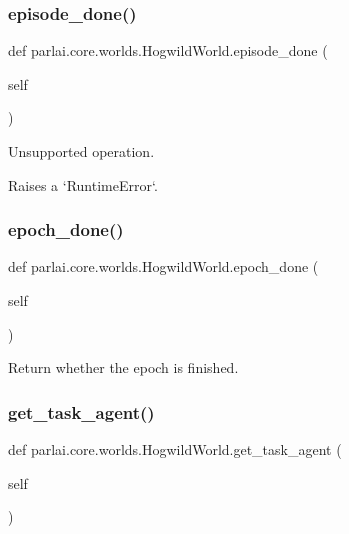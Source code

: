 \subsubsection{\texorpdfstring{episode\+\_\+done()}{episode\_done()}}
{\footnotesize\ttfamily def parlai.\+core.\+worlds.\+Hogwild\+World.\+episode\+\_\+done (\begin{DoxyParamCaption}\item[{}]{self }\end{DoxyParamCaption})}

\begin{DoxyVerb}Unsupported operation.

Raises a `RuntimeError`.
\end{DoxyVerb}
 \mbox{\label{classparlai_1_1core_1_1worlds_1_1HogwildWorld_ae80d3f592818ac39b9cf8802270d8d8a}} 
\subsubsection{\texorpdfstring{epoch\+\_\+done()}{epoch\_done()}}
{\footnotesize\ttfamily def parlai.\+core.\+worlds.\+Hogwild\+World.\+epoch\+\_\+done (\begin{DoxyParamCaption}\item[{}]{self }\end{DoxyParamCaption})}

\begin{DoxyVerb}Return whether the epoch is finished.
\end{DoxyVerb}
 \mbox{\label{classparlai_1_1core_1_1worlds_1_1HogwildWorld_a7dfc60f5229da37574c31479a0b2ce3a}} 
\subsubsection{\texorpdfstring{get\+\_\+task\+\_\+agent()}{get\_task\_agent()}}
{\footnotesize\ttfamily def parlai.\+core.\+worlds.\+Hogwild\+World.\+get\+\_\+task\+\_\+agent (\begin{DoxyParamCaption}\item[{}]{self }\end{DoxyParamCaption})}

